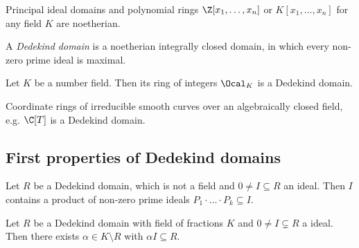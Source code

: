 \begin{exmp*}
	Principal ideal domains and polynomial rings \( \Z[x_1, \dotsc, x_n] \) or \( K[x_1, \dotsc, x_n] \) for any field \( K \) are noetherian.
\end{exmp*}

\begin{defn*}
	A \emph{Dedekind domain} is a noetherian integrally closed domain, in which every non-zero prime ideal is maximal.
\end{defn*}

\begin{thmn}
	Let \( K \) be a number field.
	Then its ring of integers \( \Ocal_K \) is a Dedekind domain.
\end{thmn}

\begin{exmp*}
	Coordinate rings of irreducible smooth curves over an algebraically closed field, e.g. \( \C[T] \) is a Dedekind domain.
\end{exmp*}

\subsection*{First properties of Dedekind domains}

\begin{lem}
	Let \( R \) be a Dedekind domain, which is not a field and \( 0 \neq I \subseteq R \) an ideal.
	Then \( I \) contains a product of non-zero prime ideals \( P_1 \cdot \dots \cdot P_k \subseteq I \).
\end{lem}

\begin{lem}
	Let \( R \) be a Dedekind domain with field of fractions \( K \) and \( 0 \neq I \subsetneq R \) a ideal.
	Then there exists \( \alpha \in K \setminus R \) with \( \alpha I \subseteq R \).
\end{lem}